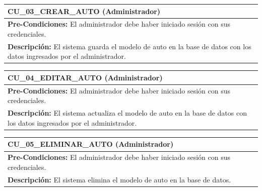 \begin{center}
  \begin{tabular}{| p{7.5cm} | p{7.5cm} |}
    \hline
    \multicolumn{2}{|p{15cm}|}{\textbf{CU\_03\_CREAR\_AUTO} (Administrador)} \\ \hline
    \multicolumn{2}{|p{15cm}|}{\textbf{Pre-Condiciones:} El administrador debe haber iniciado sesión con sus credenciales.} \\ \hline
    \multicolumn{2}{|p{15cm}|}{\textbf{Descripción:} El sistema guarda el modelo de auto en la base de datos con los datos ingresados por el administrador. } \\
    \hline
  \end{tabular}
  
  \label{table:usecase:3}
\end{center}

\begin{center}
  \begin{tabular}{| p{7.5cm} | p{7.5cm} |}
    \hline
    \multicolumn{2}{|p{15cm}|}{\textbf{CU\_04\_EDITAR\_AUTO} (Administrador)} \\ \hline
    \multicolumn{2}{|p{15cm}|}{\textbf{Pre-Condiciones:} El administrador debe haber iniciado sesión con sus credenciales.} \\ \hline
    \multicolumn{2}{|p{15cm}|}{\textbf{Descripción:} El sistema actualiza el modelo de auto en la base de datos con los datos ingresados por el administrador.} \\
    \hline
  \end{tabular}
  
  \label{table:usecase:4}
\end{center}

\begin{center}
  \begin{tabular}{| p{7.5cm} | p{7.5cm} |}
    \hline
    \multicolumn{2}{|p{15cm}|}{\textbf{CU\_05\_ELIMINAR\_AUTO} (Administrador)} \\ \hline
    \multicolumn{2}{|p{15cm}|}{\textbf{Pre-Condiciones:} El administrador debe haber iniciado sesión con sus credenciales.} \\ \hline
    \multicolumn{2}{|p{15cm}|}{\textbf{Descripción:} El sistema elimina el modelo de auto en la base de datos.} \\
    \hline
  \end{tabular}
  
  \label{table:usecase:5}
\end{center}

